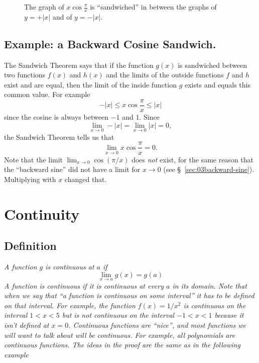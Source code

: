 \begin{figure}[h]\centering
  
  \caption{The graph of  $x\cos\frac\pi x$ is ``sandwiched'' in
    between the graphs of $y=+|x|$ and of $y=-|x|$.}
  \label{fig:03backwardCosSandwich}
\end{figure}

\subsection{Example: a Backward Cosine Sandwich. }
\label{sec:backward-cosine-sandwich}
\label{sec:03xcos1overx} The Sandwich Theorem says that if the function
$g(x)$ is sandwiched between two functions $f(x)$ and $h(x)$ and the limits
of the outside functions $f$ and $h$ exist and are equal, then the limit of
the inside function $g$ exists and equals this common value.  For example
\[
-|x|\le x\cos\frac\pi x\le |x|
\]
since the cosine is always between $-1$ and $1$. Since
\[
\lim_{x\to 0}-|x|=\lim_{x\to 0}|x|=0,
\]
the Sandwich Theorem tells us that
\[
\lim_{x\to 0} x\cos\frac\pi x =0.
\]
Note that the limit $ \lim_{x\to 0} \cos(\pi/x) $ does \emph{not}
exist, for the same reason that the ``backward sine'' did not have a
limit for $x\to0$ (see \S~\ref{sec:03backward-sine}).  Multiplying
with $x$ changed that.



\section{Continuity} 
\label{sec:continuity}

\subsection{Definition} 
\label{sec:03def-continuity}\itshape
A function $g$ is \emph{continuous} at $a$ if
\begin{equation}\label{eq:continuity-def}
  \lim_{x\to a} g(x) = g(a)
\end{equation}
A function is continuous if it is continuous at every $a$ in its
domain.\upshape\medskip
Note that when we say that ``a function is continuous on some
interval'' it has to be defined on that interval. For example, the
function $f(x)=1/x^2$ is continuous on the interval $1<x<5$ but is
\emph {not} continuous on the interval $-1<x<1$ because it isn't
defined at $x=0$.
Continuous functions are ``nice'', and most functions we will want to talk about
will be continuous.  For example, all polynomials are continuous functions. The
ideas in the proof are the same as in the following example
